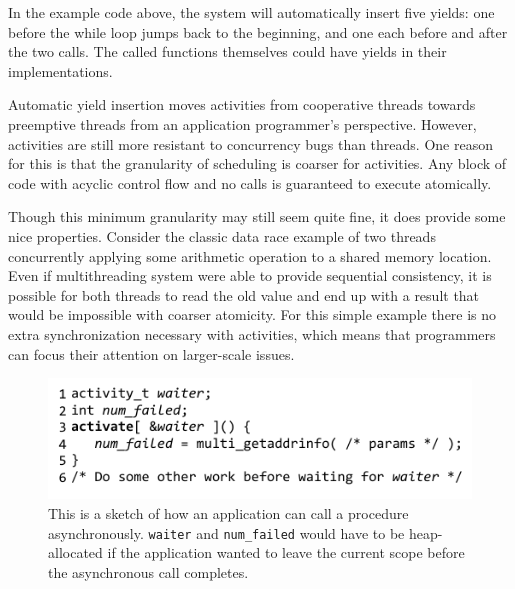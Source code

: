 \documentclass[9pt,preprint]{sigplanconf}
\begin{document}
In the example code above, the system will automatically insert five yields: one before the while loop jumps back to the beginning, and one each before and after the two calls.
The called functions themselves could have yields in their implementations.

Automatic yield insertion moves activities from cooperative threads towards preemptive threads from an application programmer's perspective.
However, activities are still more resistant to concurrency bugs than threads.
One reason for this is that the granularity of scheduling is coarser for activities.
Any block of code with acyclic control flow and no calls is guaranteed to execute atomically.

Though this minimum granularity may still seem quite fine, it does provide some nice properties.
Consider the classic data race example of two threads concurrently applying some arithmetic operation to a shared memory location.
Even if multithreading system were able to provide sequential consistency, it is possible for both threads to read the old value and end up with a result that would be impossible with coarser atomicity.
For this simple example there is no extra synchronization necessary with activities, which means that programmers can focus their attention on larger-scale issues.

\begin{figure}
\includegraphics{multi_getaddrinfo_async_call}
\caption{This is a sketch of how an application can call a procedure asynchronously.
\texttt{waiter} and \texttt{num\_failed} would have to be heap-allocated if the application wanted to leave the current scope before the asynchronous call completes.}
\label{fig:charcoal_multidns_async_call}
\end{figure}
\end{document}
